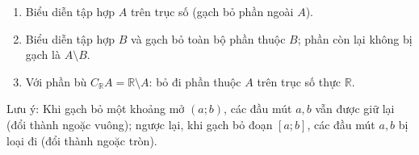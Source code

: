 \begin{enumerate}
\item Biểu diễn tập hợp $A$ trên trục số (gạch bỏ phần ngoài $A$).
\item Biểu diễn tập hợp $B$ và gạch bỏ toàn bộ phần thuộc $B$; phần còn lại không bị gạch là $A \setminus B$.
\item Với phần bù $C_{\mathbb{R}} A = \mathbb{R} \setminus A$: bỏ đi phần thuộc $A$ trên trục số thực $\mathbb{R}$.
\end{enumerate}
Lưu ý: Khi gạch bỏ một khoảng mở $(a; b)$, các đầu mút $a, b$ vẫn được giữ lại (đổi thành ngoặc vuông); ngược lại, khi gạch bỏ đoạn $[a; b]$, các đầu mút $a, b$ bị loại đi (đổi thành ngoặc tròn).
